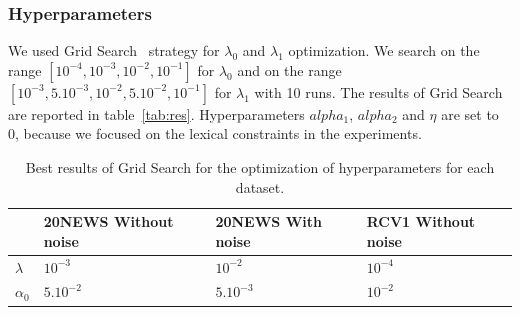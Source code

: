 \subsubsection{Hyperparameters}
We used Grid Search~\cite{SWANN1969S39} strategy for 
$\lambda_0$ and $\lambda_1$ optimization. We search on the range 
$[10^{-4},10^{-3},10^{-2},10^{-1}]$ for $\lambda_0$ and on the range
$[10^{-3},5.10^{-3},10^{-2},5.10^{-2},10^{-1}]$ for $\lambda_1$ with 10 runs.   
The results of Grid Search are reported 
in table~\ref{tab:res}. Hyperparameters $alpha_1$, $alpha_2$ and $\eta$ 
are set to 0, because we focused on the lexical constraints in the experiments. 
\begin{table}[!h]
\centering
  \begin{tabular}{| l | l | l | l |}
    \hline
               & 20NEWS Without noise & 20NEWS With noise & RCV1 Without noise 
\\ \hline
    $\lambda$  & $10^{-3}$            & $10^{-2}$         & $10^{-4}$           
\\ \hline
    $\alpha_0$ & $5.10^{-2}$          & $5.10^{-3}$       & $10^{-2}$           
\\ \hline
  \end{tabular}
  \caption{\label{tab2}Best results of Grid Search for the optimization of
hyperparameters for each dataset.}
\end{table}

